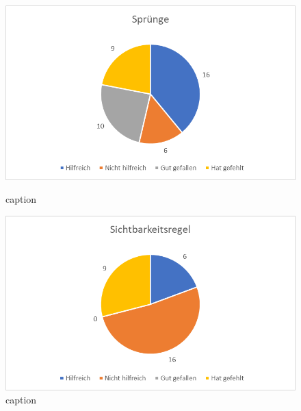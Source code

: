 \begin{figure}
   \begin{minipage}[b]{.49\linewidth} %
      \includegraphics[width=\linewidth]{pictures/diagramme/aussagenspr}
      \caption{caption}
   \end{minipage}
   \hspace{.01\linewidth}%
   \begin{minipage}[b]{.49\linewidth} %
      \includegraphics[width=\linewidth]{pictures/diagramme/aussagensichtb}
      \caption{caption}
   \end{minipage}
\end{figure}

